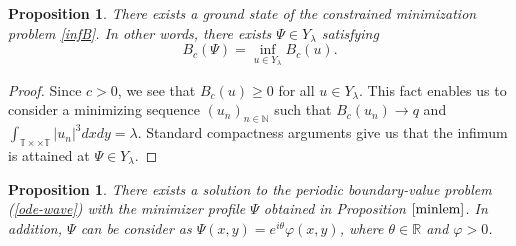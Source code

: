 \documentclass[12pt,reqno,a4paper]{amsart} %
\numberwithin{equation}{section}
\numberwithin{figure}{section}
\newtheorem{proposition}[theorem]{Proposition}
\begin{document}
\begin{proposition}
\label{minlem}
There exists a ground state
of the constrained minimization problem \eqref{infB}. In other words, there exists $\Psi\in Y_{\lambda}$ satisfying
\begin{equation}\label{minBfunc}
B_c(\Psi)=\inf_{u\in Y_{\lambda}}B_c(u).
\end{equation}
\end{proposition}

\begin{proof} Since $c>0$, we see that $B_c(u)\geq0$ for all $u\in Y_{\lambda}$. This fact enables us to consider a minimizing sequence $(u_n)_{n\in\mathbb{N}}$ such that $B_c(u_n)\rightarrow q$ and $\int_{\mathbb{T}\times\times\mathbb{T}}|u_n|^3dxdy=\lambda$. Standard compactness arguments give us that the infimum is attained at $\Psi\in Y_\lambda$.

\end{proof}		

\begin{proposition}
\label{cor-existence}
There exists a solution to the periodic boundary-value problem
(\ref{ode-wave}) with the minimizer profile $\Psi$ obtained in Proposition $\ref{minlem}$. In addition, $\Psi$ can be consider as $\Psi(x,y)=e^{i\theta}\varphi(x,y)$, where $\theta\in\mathbb{R}$ and $\varphi>0$.
\end{proposition}
\end{document}
